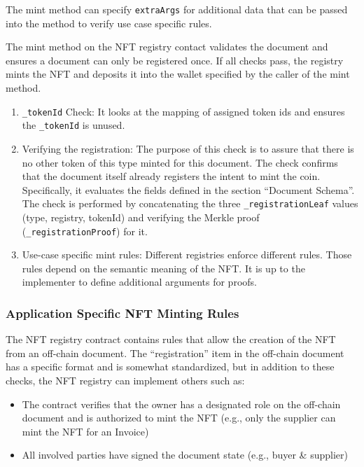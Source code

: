 \documentclass[a4paper, 10pt]{article}
\begin{document}
The mint method can specify \texttt{extraArgs} for additional data that can be passed into the method to verify use case specific rules.

The mint method on the NFT registry contact validates the document and ensures a document can only be registered once. If all checks pass, the registry mints the NFT and deposits it into the wallet specified by the caller of the mint method.

\begin{enumerate} 
\item \texttt{\_tokenId} Check: It looks at the mapping of assigned token ids and ensures the \texttt{\_tokenId} is unused. 

\item Verifying the registration: The purpose of this check is to assure that there is no other token of this type minted for this document. The check confirms that the document itself already registers the intent to mint the coin. Specifically, it evaluates the fields defined in the section “Document Schema”. The check is performed by concatenating the three \texttt{\_registrationLeaf} values (type, registry, tokenId) and verifying the Merkle proof (\texttt{\_registrationProof}) for it. 

\item Use-case specific mint rules: Different registries enforce different rules. Those rules depend on the semantic meaning of the NFT. It is up to the implementer to define additional arguments for proofs. 

\end{enumerate}
\subsubsection{Application Specific NFT Minting Rules}
The NFT registry contract contains rules that allow the creation of the NFT from an off-chain document. The “registration” item in the off-chain document has a specific format and is somewhat standardized, but in addition to these checks, the NFT registry can implement others such as:

\begin{itemize}
\item The contract verifies that the owner has a designated role on the off-chain document and is authorized to mint the NFT (e.g., only the supplier can mint the NFT for an Invoice)
\item All involved parties have signed the document state (e.g., buyer \& supplier)
\end{itemize}
\end{document}

